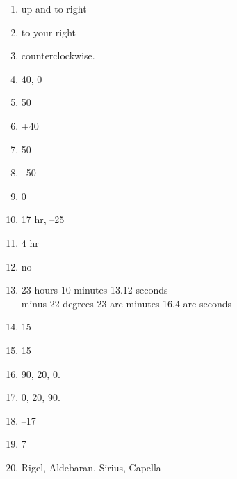 \begin{enumerate} 

\item
up and to right

\item
 to your right

\item
counterclockwise.

\item 
 40\deg, 0\deg

\item
 50\deg


\item
+40\deg

\item
50\deg


\item
--50\deg

\item
0\deg

\item
17 hr, --25\deg


\item
4 hr

\item
no

\item
 23 hours 10 minutes 13.12 seconds \\
 minus 22 degrees 23 arc minutes 16.4 arc seconds

\item 
15\deg

\item 
15 \arcsec

\item
90\deg, 20\deg, 0\deg.

\item
0\deg, 20\deg, 90\deg.


\item 

--17\deg 

\item
7\deg


\item 
Rigel, Aldebaran,  Sirius, Capella


\end{enumerate} 













